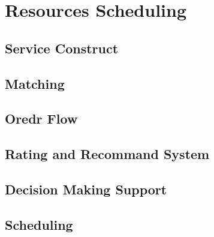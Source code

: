 \section{Resources Scheduling} %
\label{sec:model}

\subsection{Service Construct} %
\label{sub:service_construct}


\subsection{Matching} %
\label{sub:matching}


\subsection{Oredr Flow} %
\label{sub:oredr_flow}


\subsection{Rating and Recommand System} %
\label{sub:rating_&_recommand_system}


\subsection{Decision Making Support} %
\label{sub:decision_making_support}


\subsection{Scheduling} %
\label{sub:scheduling}

